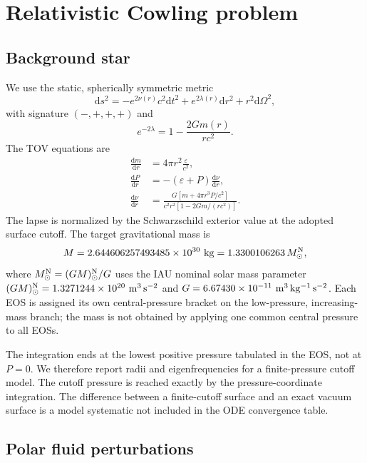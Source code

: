 \documentclass[aps,prd,twocolumn,superscriptaddress,nofootinbib]{revtex4-2}
\newcommand{\MsunN}{M_{\odot}^{\rm N}}
\newcommand{\eps}{\varepsilon}
\newcommand{\dd}{\mathrm{d}}
\begin{document}
\section{Relativistic Cowling problem}

\subsection{Background star}

We use the static, spherically symmetric metric
\begin{equation}
\dd s^2=-e^{2\nu(r)}c^2\dd t^2+e^{2\lambda(r)}\dd r^2
       +r^2\dd\Omega^2,
\end{equation}
with signature $(-,+,+,+)$ and
\begin{equation}
e^{-2\lambda}=1-\frac{2Gm(r)}{rc^2}.
\end{equation}
The TOV equations are
\begin{align}
\frac{\dd m}{\dd r}&=4\pi r^2\frac{\eps}{c^2},\\
\frac{\dd P}{\dd r}&=-(\eps+P)\frac{\dd\nu}{\dd r},\\
\frac{\dd\nu}{\dd r}
&=\frac{G\left[m+4\pi r^3P/c^2\right]}
{c^2r^2\left[1-2Gm/(rc^2)\right]}.
\end{align}
The lapse is normalized by the Schwarzschild exterior value at the adopted surface cutoff. The target gravitational mass is
\begin{equation}
M=2.644606257493485\times10^{30}\ {\rm kg}
 =1.3300106263\,\MsunN,
\end{equation}
where $\MsunN=(GM)_\odot^{\rm N}/G$ uses the IAU nominal solar mass parameter $(GM)_\odot^{\rm N}=1.3271244\times10^{20}\ {\rm m^3\,s^{-2}}$ and $G=6.67430\times10^{-11}\ {\rm m^3\,kg^{-1}\,s^{-2}}$. Each EOS is assigned its own central-pressure bracket on the low-pressure, increasing-mass branch; the mass is not obtained by applying one common central pressure to all EOSs.

The integration ends at the lowest positive pressure tabulated in the EOS, not at $P=0$. We therefore report radii and eigenfrequencies for a finite-pressure cutoff model. The cutoff pressure is reached exactly by the pressure-coordinate integration. The difference between a finite-cutoff surface and an exact vacuum surface is a model systematic not included in the ODE convergence table.

\subsection{Polar fluid perturbations}
\end{document}
